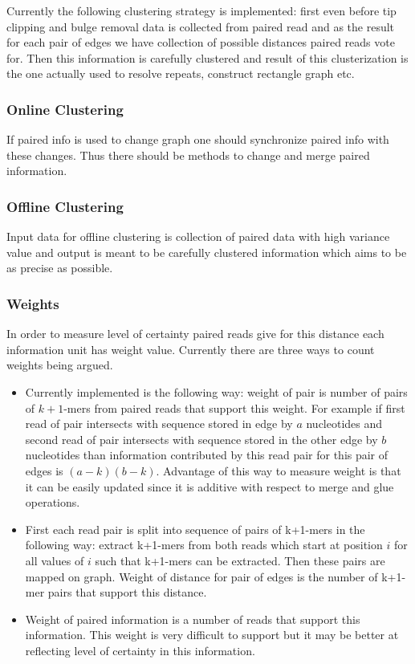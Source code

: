 \documentclass[12pt]{article}
\begin{document}
Currently the following clustering strategy is implemented: first even before tip clipping and bulge removal data is collected from paired read and as the result for each pair of edges we have collection of possible distances paired reads vote for. Then this information is carefully clustered and result of this clusterization is the one actually used to resolve repeats, construct rectangle graph etc.

\subsubsection{Online Clustering}

If paired info is used to change graph one should synchronize paired info with these changes. Thus there should be methods to change and merge paired information.

\subsubsection{Offline Clustering}

Input data for offline clustering is collection of paired data with high variance value and output is meant to be carefully clustered information which aims to be as precise as possible.

\subsubsection{Weights}
In order to measure level of certainty paired reads give for this distance each information unit has weight value. Currently there are three ways to count weights being argued.

\begin{itemize}
\item Currently implemented is the following way: weight of pair is number of pairs of $k+1$-mers from paired reads that support this weight. For example if first read of pair intersects with sequence stored in edge by $a$ nucleotides and second read of pair intersects with sequence stored in the other edge by $b$ nucleotides than information contributed by this read pair for this pair of edges is $(a - k)(b - k)$. Advantage of this way to measure weight is that it can be easily updated since it is additive with respect to merge and glue operations.
\item First each read pair is split into sequence of pairs of k+1-mers in the following way: extract k+1-mers from both reads which start at position $i$ for all values of $i$ such that k+1-mers can be extracted. Then these pairs are mapped on graph. Weight of distance for pair of edges is the number of k+1-mer pairs that support this distance.
\item Weight of paired information is a number of reads that support this information. This weight is very difficult to support but it may be better at reflecting level of certainty in this information.
\end{itemize}
\end{document}
